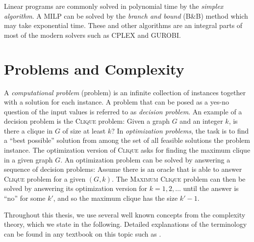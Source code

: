 Linear programs are commonly solved in polynomial time by the \emph{simplex algorithm}.
A MILP can be solved by the \emph{branch and bound} (B\&B) method which may take exponential time.
These and other algorithms are an integral parts of most of the modern solvers such as CPLEX and GUROBI.

\section{Problems and Complexity}\label{sect:probcomp}

A \emph{computational problem} (problem) is an infinite collection of instances together with a solution for each instance.
A problem that can be posed as a yes-no question of the input values is referred to as \emph{decision problem}.
An example of a decision problem is the \textsc{Clique} problem: Given a graph $G$ and an integer $k$, is there a clique in $G$ of size at least $k$?
In \emph{optimization problems}, the task is to find a ``best possible'' solution from among the set of all feasible solutions the problem instance.
The optimization version of \textsc{Clique} asks for finding the maximum clique in a given graph $G$.
An optimization problem can be solved by answering a sequence of decision problems:
Assume there is an oracle that is able to answer \textsc{Clique} problem for a given $(G,k)$.
The \textsc{Maximum Clique} problem can then be solved by answering its optimization version for $k=1,2,\dots$ until the answer is ``no'' for some $k'$, and so the maximum clique has the size $k'-1$.

Throughout this thesis, we use several well known concepts from the complexity theory, which we state in the following.
Detailed explanations of the terminology can be found in any textbook on this topic such as \cite{sipser06}.

